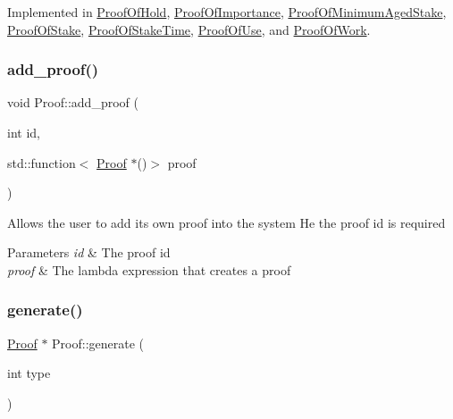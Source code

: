 Implemented in \mbox{\hyperlink{classProofOfHold_a4aa0ee52c0a6dcac18ab5ed84aae92e1}{Proof\+Of\+Hold}}, \mbox{\hyperlink{classProofOfImportance_a42a29f16c0c9e5e097fd734b7ee3fcf8}{Proof\+Of\+Importance}}, \mbox{\hyperlink{classProofOfMinimumAgedStake_aa42f7b715bb986143b5dda841782745b}{Proof\+Of\+Minimum\+Aged\+Stake}}, \mbox{\hyperlink{classProofOfStake_a5ee2b37cb25c63e1baa5c5b04e2dfca2}{Proof\+Of\+Stake}}, \mbox{\hyperlink{classProofOfStakeTime_ae05431416e9157fb8af8247b8e756794}{Proof\+Of\+Stake\+Time}}, \mbox{\hyperlink{classProofOfUse_a315614eb2b05b40367bdc11e60b7b8be}{Proof\+Of\+Use}}, and \mbox{\hyperlink{classProofOfWork_aa414484a6dc03fec583996a591f36856}{Proof\+Of\+Work}}.

\mbox{\label{classProof_a71874539fdbcc93c15594b889c95225b}} 
\subsubsection{\texorpdfstring{add\+\_\+proof()}{add\_proof()}}
{\footnotesize\ttfamily void Proof\+::add\+\_\+proof (\begin{DoxyParamCaption}\item[{int}]{id,  }\item[{std\+::function$<$ \mbox{\hyperlink{classProof}{Proof}} $\ast$()$>$}]{proof }\end{DoxyParamCaption})\hspace{0.3cm}{\ttfamily [static]}}

Allows the user to add its own proof into the system He the proof id is required


\begin{DoxyParams}{Parameters}
{\em id} & The proof id \\
\hline
{\em proof} & The lambda expression that creates a proof \\
\hline
\end{DoxyParams}
\mbox{\label{classProof_a267f0f4587babb59884b5f280e2d54c8}} 
\subsubsection{\texorpdfstring{generate()}{generate()}}
{\footnotesize\ttfamily \mbox{\hyperlink{classProof}{Proof}} $\ast$ Proof\+::generate (\begin{DoxyParamCaption}\item[{int}]{type }\end{DoxyParamCaption})\hspace{0.3cm}{\ttfamily [static]}}

